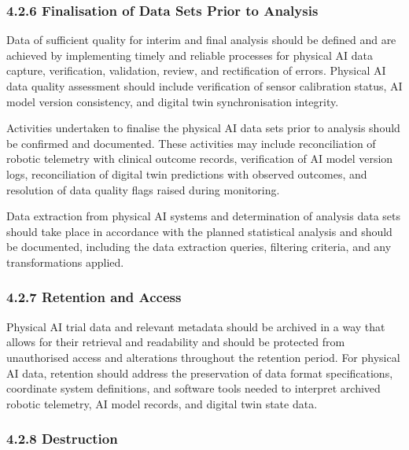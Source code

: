 \documentclass[11pt]{article}
\begin{document}
\subsubsection{4.2.6 Finalisation of Data Sets Prior to Analysis}

\begin{description}[leftmargin=2.5cm,style=sameline]

\item[(a)] Data of sufficient quality for interim and final analysis should be defined and are achieved by implementing timely and reliable processes for physical AI data capture, verification, validation, review, and rectification of errors. Physical AI data quality assessment should include verification of sensor calibration status, AI model version consistency, and digital twin synchronisation integrity.

\item[(b)] Activities undertaken to finalise the physical AI data sets prior to analysis should be confirmed and documented. These activities may include reconciliation of robotic telemetry with clinical outcome records, verification of AI model version logs, reconciliation of digital twin predictions with observed outcomes, and resolution of data quality flags raised during monitoring.

\item[(c)] Data extraction from physical AI systems and determination of analysis data sets should take place in accordance with the planned statistical analysis and should be documented, including the data extraction queries, filtering criteria, and any transformations applied.

\end{description}

\subsubsection{4.2.7 Retention and Access}

Physical AI trial data and relevant metadata should be archived in a way that allows for their retrieval and readability and should be protected from unauthorised access and alterations throughout the retention period. For physical AI data, retention should address the preservation of data format specifications, coordinate system definitions, and software tools needed to interpret archived robotic telemetry, AI model records, and digital twin state data.

\subsubsection{4.2.8 Destruction}
\end{document}
